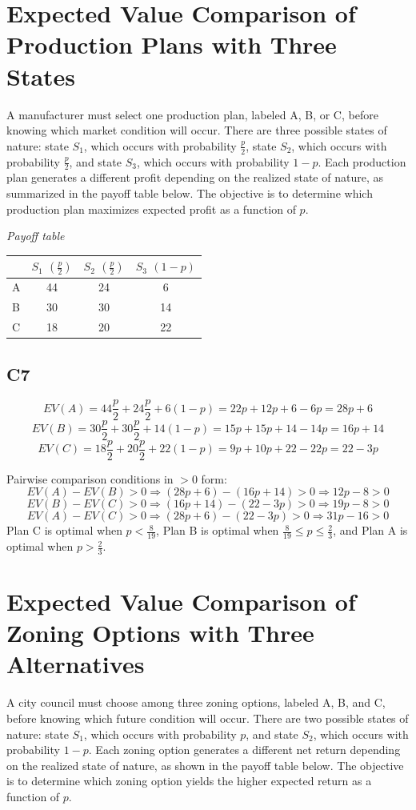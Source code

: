\begin{ExamProblems}
		\section{Expected Value Comparison of Production Plans with Three States}
		A manufacturer must select one production plan, labeled A, B, or C, before knowing which market condition will occur.
		There are three possible states of nature: state $S_1$, which occurs with probability $\frac{p}{2}$,
		state $S_2$, which occurs with probability $\frac{p}{2}$, and state $S_3$, which occurs with probability $1-p$.
		Each production plan generates a different profit depending on the realized state of nature, as summarized in the payoff table below.
		The objective is to determine which production plan maximizes expected profit as a function of $p$.
		
		\begin{center}
			\textit{Payoff table} \\
			\begin{tabular}{l c c c}
				\toprule
				& $S_1$ $\left(\frac{p}{2}\right)$ & $S_2$ $\left(\frac{p}{2}\right)$ & $S_3$ $(1-p)$ \\
				\midrule
				A & 44 & 24 & 6 \\
				B & 30 & 30 & 14 \\
				C & 18 & 20 & 22 \\
				\bottomrule
			\end{tabular}
		\end{center}
		
		\subsection*{C7}
		\[
		EV(A)=44\frac{p}{2}+24\frac{p}{2}+6(1-p)=22p+12p+6-6p=28p+6
		\]
		\[
		EV(B)=30\frac{p}{2}+30\frac{p}{2}+14(1-p)=15p+15p+14-14p=16p+14
		\]
		\[
		EV(C)=18\frac{p}{2}+20\frac{p}{2}+22(1-p)=9p+10p+22-22p=22-3p
		\]
		
		Pairwise comparison conditions in $>0$ form:
		\[
		EV(A)-EV(B)>0 \Rightarrow (28p+6)-(16p+14)>0 \Rightarrow 12p-8>0
		\]
		\[
		EV(B)-EV(C)>0 \Rightarrow (16p+14)-(22-3p)>0 \Rightarrow 19p-8>0
		\]
		\[
		EV(A)-EV(C)>0 \Rightarrow (28p+6)-(22-3p)>0 \Rightarrow 31p-16>0
		\]
		Plan C is optimal when $p<\frac{8}{19}$, Plan B is optimal when $\frac{8}{19} \le p \le \frac{2}{3}$,
		and Plan A is optimal when $p>\frac{2}{3}$.
		
		\item
		\section{Expected Value Comparison of Zoning Options with Three Alternatives}
		A city council must choose among three zoning options, labeled A, B, and C, before knowing which future condition will occur.
		There are two possible states of nature: state $S_1$, which occurs with probability $p$, and state $S_2$, which occurs with probability $1-p$.
		Each zoning option generates a different net return depending on the realized state of nature, as shown in the payoff table below.
		The objective is to determine which zoning option yields the higher expected return as a function of $p$.
		

\end{ExamProblems}
